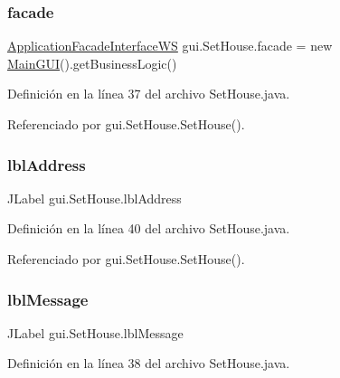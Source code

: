 \subsubsection{\texorpdfstring{facade}{facade}}
{\footnotesize\ttfamily \mbox{\hyperlink{interfacebusiness_logic_1_1_application_facade_interface_w_s}{Application\+Facade\+Interface\+WS}} gui.\+Set\+House.\+facade = new \mbox{\hyperlink{classgui_1_1_main_g_u_i}{Main\+G\+UI}}().get\+Business\+Logic()\hspace{0.3cm}{\ttfamily [private]}}



Definición en la línea 37 del archivo Set\+House.\+java.



Referenciado por gui.\+Set\+House.\+Set\+House().

\mbox{\label{classgui_1_1_set_house_ad76075de3f61a56b63db0a9c49b7f9a3}} 
\subsubsection{\texorpdfstring{lblAddress}{lblAddress}}
{\footnotesize\ttfamily J\+Label gui.\+Set\+House.\+lbl\+Address\hspace{0.3cm}{\ttfamily [private]}}



Definición en la línea 40 del archivo Set\+House.\+java.



Referenciado por gui.\+Set\+House.\+Set\+House().

\mbox{\label{classgui_1_1_set_house_a7aed946e97375e1948b4ca8829a2e3a1}} 
\subsubsection{\texorpdfstring{lblMessage}{lblMessage}}
{\footnotesize\ttfamily J\+Label gui.\+Set\+House.\+lbl\+Message\hspace{0.3cm}{\ttfamily [private]}}



Definición en la línea 38 del archivo Set\+House.\+java.



